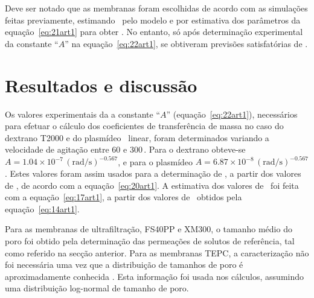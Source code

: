 Deve ser notado que as membranas foram escolhidas de acordo com as simulações feitas previamente, estimando \permm\ pelo modelo e por estimativa dos parâmetros da equação~\ref{eq:21art1} para obter \coeficientemassa. No entanto, só após determinação experimental da constante ``$A$'' na equação~\ref{eq:22art1}, se obtiveram previsões satisfatórias de \permobs.

\section{Resultados e discussão}
Os valores experimentais da a constante ``$A$'' (equação~\ref{eq:22art1}), necessários para efetuar o cálculo dos coeficientes de transferência de massa no caso do dextrano T2000 e do plasmídeo \pUC\ linear, foram determinados variando a velocidade de agitação entre 60 e 300\,\minmum. Para o dextrano obteve-se $A=1.04\times 10^{-7}\,(\mathrm{rad/s})^{-0.567}$, e para o plasmídeo $A=6.87\times 10^{-8}\,(\mathrm{rad/s})^{-0.567}$. Estes valores foram assim usados para a determinação de \permobs, a partir dos valores de \permm, de acordo com a equação~\ref{eq:20art1}. A estimativa dos valores de \permm\ foi feita com a equação~\ref{eq:17art1}, a partir dos valores de \particao\ obtidos pela equação~\ref{eq:14art1}.

Para as membranas de ultrafiltração, FS40PP e XM300, o tamanho médio do poro foi obtido pela determinação das permeações de solutos de referência, tal como referido na secção anterior. Para as membranas TEPC, a caracterização não foi necessária uma vez que a distribuição de tamanhos de poro é aproximadamente conhecida \cite{kim97}. Esta informação foi usada nos cálculos, assumindo uma distribuição log-normal de tamanho de poro.


